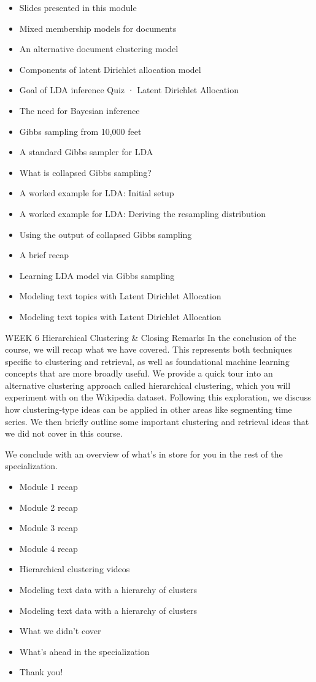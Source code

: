 \begin{itemize}
\item Slides presented in this module
\item Mixed membership models for documents
\item An alternative document clustering model
\item Components of latent Dirichlet allocation model
\item Goal of LDA inference
Quiz · Latent Dirichlet Allocation
\item The need for Bayesian inference
\item Gibbs sampling from 10,000 feet
\item A standard Gibbs sampler for LDA
\item What is collapsed Gibbs sampling?
\item A worked example for LDA: Initial setup
\item A worked example for LDA: Deriving the resampling distribution
\item Using the output of collapsed Gibbs sampling
\item A brief recap
\item Learning LDA model via Gibbs sampling
\item Modeling text topics with Latent Dirichlet Allocation
\item Modeling text topics with Latent Dirichlet Allocation
\end{itemize}
WEEK 6
Hierarchical Clustering & Closing Remarks
In the conclusion of the course, we will recap what we have covered. This represents both techniques specific to clustering and retrieval, as well as foundational machine learning concepts that are more broadly useful.
We provide a quick tour into an alternative clustering approach called hierarchical clustering, which you will experiment with on the Wikipedia dataset. Following this exploration, we discuss how clustering-type ideas can be applied in other areas like segmenting time series. We then briefly outline some important clustering and retrieval ideas that we did not cover in this course.

We conclude with an overview of what's in store for you in the rest of the specialization.
\begin{itemize}
\item Module 1 recap
\item Module 2 recap
\item Module 3 recap
\item Module 4 recap
\item Hierarchical clustering videos
\item Modeling text data with a hierarchy of clusters
\item Modeling text data with a hierarchy of clusters
\item What we didn't cover
\item What's ahead in the specialization
\item Thank you!
\end{itemize}

